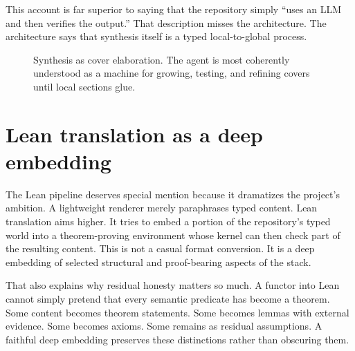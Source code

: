 This account is far superior to saying that the repository simply ``uses an LLM and then
verifies the output.'' That description misses the architecture. The architecture says that
synthesis itself is a typed local-to-global process.

\begin{figure}[h]
\centering
{}
\caption{Synthesis as cover elaboration. The agent is most coherently understood as a machine for growing, testing, and refining covers until local sections glue.}
\end{figure}

\section*{Lean translation as a deep embedding}
The Lean pipeline deserves special mention because it dramatizes the project's ambition. A
lightweight renderer merely paraphrases typed content. Lean translation aims higher. It tries
to embed a portion of the repository's typed world into a theorem-proving environment whose
kernel can then check part of the resulting content. This is not a casual format conversion.
It is a deep embedding of selected structural and proof-bearing aspects of the stack.

That also explains why residual honesty matters so much. A functor into Lean cannot simply
pretend that every semantic predicate has become a theorem. Some content becomes theorem
statements. Some becomes lemmas with external evidence. Some becomes axioms. Some remains as
residual assumptions. A faithful deep embedding preserves these distinctions rather than
obscuring them.

